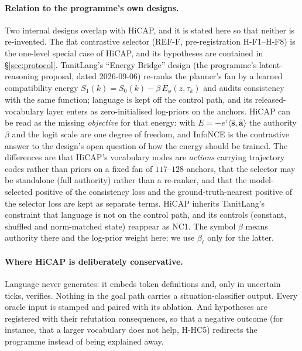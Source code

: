 \paragraph{Relation to the programme's own designs.}
Two internal designs overlap with HiCAP, and it is stated here so that neither is re-invented. The flat contrastive selector (REF-F, pre-registration H-F1--H-F8) is the one-level special case of HiCAP, and its hypotheses are contained in \S\ref{sec:protocol}.
TanitLang's ``Energy Bridge'' design (the programme's latent-reasoning proposal, dated 2026-09-06) re-ranks the planner's fan by a learned compatibility energy $S_1(k)=S_0(k)-\beta\,E_\phi(z,\tau_k)$ and audits consistency with the same function; language is kept off the control path, and its released-vocabulary layer enters as zero-initialised log-priors on the anchors\evI.
HiCAP can be read as the missing \emph{objective} for that energy: with $E=-e^{\tau}\langle\hat{\mathbf s},\hat{\mathbf a}\rangle$ the authority $\beta$ and the logit scale are one degree of freedom, and InfoNCE is the contrastive answer to the design's open question of how the energy should be trained.
The differences are that HiCAP's vocabulary nodes are \emph{actions} carrying trajectory codes rather than priors on a fixed fan of $117$--$128$ anchors, that the selector may be standalone (full authority) rather than a re-ranker, and that the model-selected positive of the consistency loss and the ground-truth-nearest positive of the selector loss are kept as separate terms. HiCAP inherits TanitLang's constraint that language is not on the control path, and its controls (constant, shuffled and norm-matched state) reappear as NC1.
The symbol $\beta$ means authority there and the log-prior weight here; we use $\beta_\ell$ only for the latter.

\paragraph{Where HiCAP is deliberately conservative.} Language never generates: it embeds token definitions and, only in uncertain ticks, verifies. Nothing in the goal path carries a situation-classifier output. Every oracle input is stamped and paired with its ablation. And hypotheses are registered with their refutation consequences, so that a negative outcome (for instance, that a larger vocabulary does not help, H-HC5) redirects the programme instead of being explained away.
